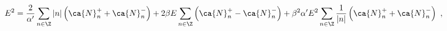 \begin{equation}
E^2 = \frac{2}{\alpha'} \sum_{n \in \Z} 
|n| \left( \ca{N}^+_n + \ca{N}^-_n \right)
+ 2\beta E \sum_{n \in \Z} \left( \ca{N}^+_n - \ca{N}^-_n \right)
+ \beta^2 \alpha' E^2 \sum_{n \in \Z} 
\frac{1}{|n|} \left( \ca{N}^+_n + \ca{N}^-_n \right)\ ,
\end{equation}

